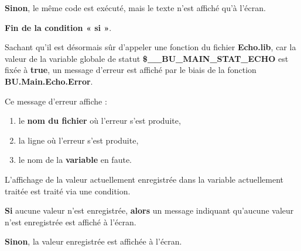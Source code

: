 \documentclass[a4paper,10pt]{article}
\begin{document}
\setlength{\parskip}{1em}

\begin{justify}
    \textbf{\color{cond}Sinon}, le même code est exécuté, mais le texte n'est affiché qu'à l'écran.
\end{justify}

\begin{justify}
    \textbf{\color{cond}Fin de la condition « si »}.
\end{justify}

\setlength{\parskip}{2em}


\begin{justify}
    Sachant qu'il est désormais sûr d'appeler une fonction du fichier \textbf{\color{path}Echo.lib}, car la valeur de la variable globale de statut \textbf{\color{vars}\$\_\_BU\_MAIN\_STAT\_ECHO} est fixée à \textbf{true}, un message d'erreur est affiché par le biais de la fonction \textbf{\color{func}BU.Main.Echo.Error}.
\end{justify}

\setlength{\parskip}{1em}

\begin{justify}
    Ce message d'erreur affiche :
    \begin{enumerate}
        \item le \textbf{\color{path}nom du fichier} où l'erreur s'est produite,
        \item la ligne où l'erreur s'est produite,
        \item le nom de la \textbf{\color{vars}variable} en faute.
    \end{enumerate}
\end{justify}


\setlength{\parskip}{2em}

\begin{justify}
    L'affichage de la valeur actuellement enregistrée dans la variable actuellement traitée est traité via une condition.
\end{justify}

\setlength{\parskip}{1em}

\begin{justify}
    \textbf{\color{cond}Si} aucune valeur n'est enregistrée, \textbf{\color{cond}alors} un message indiquant qu'aucune valeur n'est enregistrée est affiché à l'écran.
\end{justify}

\begin{justify}
    \textbf{\color{cond}Sinon}, la valeur enregistrée est affichée à l'écran.
\end{justify}
\end{document}
